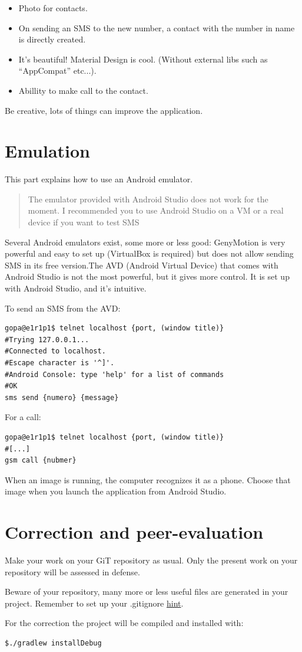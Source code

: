 \begin{itemize}
\item
	Photo for contacts.
\item
	On sending an SMS to the new number, a contact with the number in name is directly created.
\item
	It's beautiful! Material Design is cool. (Without external libs such as ``AppCompat'' etc...).
\item
	Abillity to make call to the contact.
\end{itemize}

Be creative, lots of things can improve the application.

\section{Emulation}

This part explains how to use an Android emulator.

\begin{quote}
The emulator provided with Android Studio does not work for the moment. I recommended you to use Android Studio on a VM or a real device if you want to test SMS
\end{quote}

Several Android emulators exist, some more or less good: GenyMotion is very powerful and easy to set up (VirtualBox is required) but does not allow sending SMS in its free version.The AVD (Android Virtual Device) that comes with Android Studio is not the most powerful, but it gives more control. It is set up with Android Studio, and it's intuitive.

To send an SMS from the AVD\@:
\begin{verbatim}
gopa@e1r1p1$ telnet localhost {port, (window title)}
#Trying 127.0.0.1...
#Connected to localhost.
#Escape character is '^]'.
#Android Console: type 'help' for a list of commands
#OK
sms send {numero} {message}
\end{verbatim}

For a call:
\begin{verbatim}
gopa@e1r1p1$ telnet localhost {port, (window title)}
#[...]
gsm call {nubmer}
\end{verbatim}

When an image is running, the computer recognizes it as a phone. Choose that image when you launch the application from Android Studio.

\section{Correction and peer-evaluation}

Make your work on your GiT repository as usual. Only the present work on
your repository will be assessed in defense.

Beware of your repository, many more or less useful files are generated in your project. Remember to set up your .gitignore \href{https://www.gitignore.io/}{hint}.

For the correction the project will be compiled and installed with:
\begin{verbatim}
$./gradlew installDebug
\end{verbatim}

